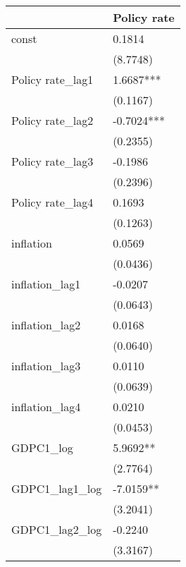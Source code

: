 \begin{table}
\caption{}
\label{}
\begin{center}
\begin{tabular}{ll}
\hline
                       & Policy rate          \\
\hline
const                  & 0.1814               \\
                       & (8.7748)             \\
Policy rate\_lag1      & 1.6687***            \\
                       & (0.1167)             \\
Policy rate\_lag2      & -0.7024***           \\
                       & (0.2355)             \\
Policy rate\_lag3      & -0.1986              \\
                       & (0.2396)             \\
Policy rate\_lag4      & 0.1693               \\
                       & (0.1263)             \\
inflation              & 0.0569               \\
                       & (0.0436)             \\
inflation\_lag1        & -0.0207              \\
                       & (0.0643)             \\
inflation\_lag2        & 0.0168               \\
                       & (0.0640)             \\
inflation\_lag3        & 0.0110               \\
                       & (0.0639)             \\
inflation\_lag4        & 0.0210               \\
                       & (0.0453)             \\
GDPC1\_log             & 5.9692**             \\
                       & (2.7764)             \\
GDPC1\_lag1\_log       & -7.0159**            \\
                       & (3.2041)             \\
GDPC1\_lag2\_log       & -0.2240              \\
                       & (3.3167)             \\

\end{tabular}
\end{center}
\end{table}

